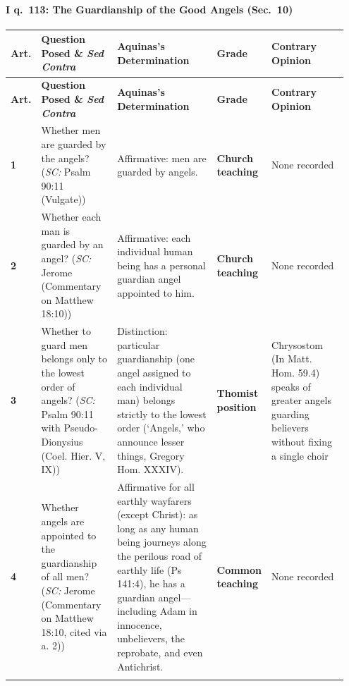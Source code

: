 \paragraph{I q.~113: The Guardianship of the Good Angels (Sec.~10)}
{\scriptsize
\setlength{\tabcolsep}{2.5pt}
\renewcommand{\arraystretch}{1.15}
\begin{longtable}{>{\raggedright\arraybackslash}p{0.05\linewidth}>{\raggedright\arraybackslash}p{0.23\linewidth}>{\raggedright\arraybackslash}p{0.31\linewidth}>{\raggedright\arraybackslash}p{0.12\linewidth}>{\raggedright\arraybackslash}p{0.24\linewidth}}
\toprule
\textbf{Art.} & \textbf{Question Posed \& \emph{Sed Contra}} & \textbf{Aquinas's Determination} & \textbf{Grade} & \textbf{Contrary Opinion} \\
\midrule
\endfirsthead
\toprule
\textbf{Art.} & \textbf{Question Posed \& \emph{Sed Contra}} & \textbf{Aquinas's Determination} & \textbf{Grade} & \textbf{Contrary Opinion} \\
\midrule
\endhead
\bottomrule
\endfoot
\textbf{1} & Whether men are guarded by the angels? (\emph{SC:} Psalm 90:11 (Vulgate)) & Affirmative: men are guarded by angels. & \textbf{Church teaching} & None recorded \\
\addlinespace[1.5pt]
\textbf{2} & Whether each man is guarded by an angel? (\emph{SC:} Jerome (Commentary on Matthew 18:10)) & Affirmative: each individual human being has a personal guardian angel appointed to him. & \textbf{Church teaching} & None recorded \\
\addlinespace[1.5pt]
\textbf{3} & Whether to guard men belongs only to the lowest order of angels? (\emph{SC:} Psalm 90:11 with Pseudo-Dionysius (Coel. Hier. V, IX)) & Distinction: particular guardianship (one angel assigned to each individual man) belongs strictly to the lowest order (`Angels,' who announce lesser things, Gregory Hom. XXXIV). & \textbf{Thomist position} & Chrysostom (In Matt. Hom. 59.4) speaks of greater angels guarding believers without fixing a single choir \\
\addlinespace[1.5pt]
\textbf{4} & Whether angels are appointed to the guardianship of all men? (\emph{SC:} Jerome (Commentary on Matthew 18:10, cited via a. 2)) & Affirmative for all earthly wayfarers (except Christ): as long as any human being journeys along the perilous road of earthly life (Ps 141:4), he has a guardian angel---including Adam in innocence, unbelievers, the reprobate, and even Antichrist. & \textbf{Common teaching} & None recorded \\
\addlinespace[1.5pt]

\end{longtable}}
